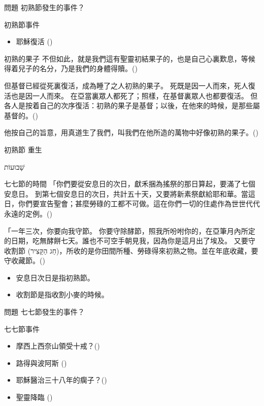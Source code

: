 \documentclass{beamer}
\newcommand{\topic}[1]{
\begin{frame}
    \centering
    \vspace*{1cm}
    {\fontsize{40}{48}\selectfont #1\par}
    \vfill
\end{frame}
}
\newcommand{\question}[1]{
\begin{frame}{問題}
    \centering
    \vspace*{1cm}
    \huge #1？\par
    \vfill
\end{frame}
}
\newcommand{\conclusion}[2]{
\begin{frame}
    \centering
    \vspace*{1cm}
    {\fontsize{40}{48}\selectfont #1 \textemdash #2\par}
    \vfill
\end{frame}
}
\newcommand{\parvspace}{\par\vspace{0.5em}}
\begin{document}
\question{初熟節發生的事件}

\begin{frame}{初熟節事件}
	\begin{itemize}
		\item 耶穌復活 ()
	\end{itemize}
\end{frame}

\begin{frame}{初熟的果子}
	不但如此，就是我們這有聖靈\alert{初結果子}的，也是自己心裏歎息，等候得着兒子的名分，乃是我們的身體得贖。()\parvspace
	但基督已經從死裏復活，成為\alert{睡了之人初熟的果子}。 死既是因一人而來，死人復活也是因一人而來。 在亞當裏眾人都死了；照樣，在基督裏眾人也都要復活。 但各人是按着自己的次序復活：\alert{初熟的果子是基督}；以後，在他來的時候，是那些屬基督的。()\parvspace
	他按自己的旨意，用真道生了我們，叫我們在他所造的萬物中好像\alert{初熟的果子}。()\parvspace
\end{frame}

\conclusion{初熟節}{重生}

\topic{\texthebrew{שָׁבוּעוֹת}}

\begin{frame}{七七節的時間}
	「你們要從\alert{安息日的次日}，獻禾捆為搖祭的那日算起，要\alert{滿了七個安息日}。 到\alert{第七個安息日的次日，共計五十天}，又要將新素祭獻給耶和華。\textellipsis{}當這日，你們要宣告聖會；\alert{甚麼勞碌的工都不可做}。這在你們一切的住處作為世世代代永遠的定例。()\parvspace
	「一年三次，你要向我守節。 你要守除酵節，照我所吩咐你的，在亞筆月內所定的日期，吃無酵餅七天。誰也不可空手朝見我，因為你是這月出了埃及。 又要守\alert{收割節 (\texthebrew{חַג הַקָּצִיר})}，所收的是你田間所種、勞碌得來初熟之物。並在年底收藏，要守收藏節。()\parvspace
	\begin{itemize}
		\item 安息日次日是指初熟節。
		\item 收割節是指收割小麥的時候。
	\end{itemize}
\end{frame}

\question{七七節發生的事件}

\begin{frame}{七七節事件}
	\begin{itemize}
		\item 摩西上西奈山領受十戒？()\parencite{TenCommandmentsOnShavuot}
		\item 路得與波阿斯 ()
		\item 耶穌醫治三十八年的瘸子？()
		\item 聖靈降臨 ()
	\end{itemize}
\end{frame}
\end{document}
